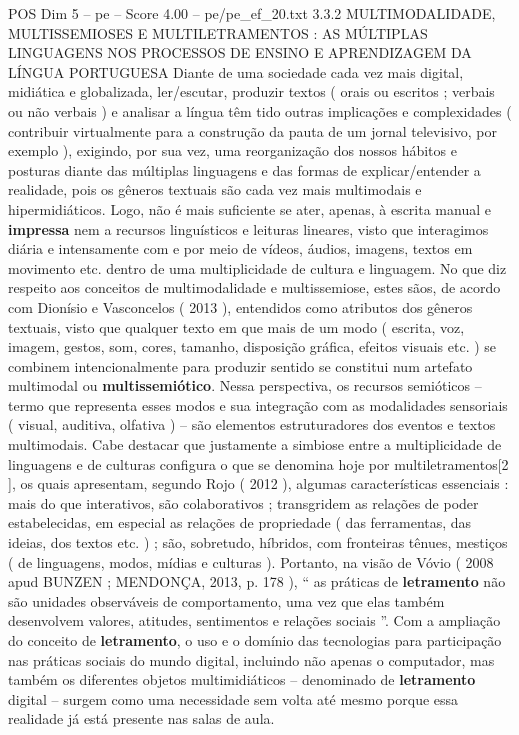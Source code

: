 \begin{textsample}{POS Dim 5 – pe – Score 4.00 – pe/pe\_ef\_20.txt}  \label{ex:f5_pos_210}
3.3.2 MULTIMODALIDADE, MULTISSEMIOSES E MULTILETRAMENTOS : AS MÚLTIPLAS LINGUAGENS NOS PROCESSOS DE ENSINO E APRENDIZAGEM DA LÍNGUA PORTUGUESA Diante de uma sociedade cada vez mais digital, midiática e globalizada, ler/escutar, produzir textos ( orais ou escritos ; verbais ou não verbais ) e analisar a língua têm tido outras implicações e complexidades ( contribuir virtualmente para a construção da pauta de um jornal televisivo, por exemplo ), exigindo, por sua vez, uma reorganização dos nossos hábitos e posturas diante das múltiplas linguagens e das formas de explicar/entender a realidade, pois os gêneros textuais são cada vez mais multimodais e hipermidiáticos.
Logo, não é mais suficiente se ater, apenas, à escrita manual e \textbf{impressa} nem a recursos linguísticos e leituras lineares, visto que interagimos diária e intensamente com e por meio de vídeos, áudios, imagens, textos em movimento etc. dentro de uma multiplicidade de cultura e linguagem.
No que diz respeito aos conceitos de multimodalidade e multissemiose, estes sãos, de acordo com Dionísio e Vasconcelos ( 2013 ), entendidos como atributos dos gêneros textuais, visto que qualquer texto em que mais de um modo ( escrita, voz, imagem, gestos, som, cores, tamanho, disposição gráfica, efeitos visuais etc. ) se combinem intencionalmente para produzir sentido se constitui num artefato multimodal ou \textbf{multissemiótico}.
Nessa perspectiva, os recursos semióticos – termo que representa esses modos e sua integração com as modalidades sensoriais ( visual, auditiva, olfativa ) – são elementos estruturadores dos eventos e textos multimodais.
Cabe destacar que justamente a simbiose entre a multiplicidade de linguagens e de culturas configura o que se denomina hoje por multiletramentos[2 ], os quais apresentam, segundo Rojo ( 2012 ), algumas características essenciais : mais do que interativos, são colaborativos ; transgridem as relações de poder estabelecidas, em especial as relações de propriedade ( das ferramentas, das ideias, dos textos etc. ) ; são, sobretudo, híbridos, com fronteiras tênues, mestiços ( de linguagens, modos, mídias e culturas ).
Portanto, na visão de Vóvio ( 2008 apud BUNZEN ; MENDONÇA, 2013, p. 178 ), “ as práticas de \textbf{letramento} não são unidades observáveis de comportamento, uma vez que elas também desenvolvem valores, atitudes, sentimentos e relações sociais ”.
Com a ampliação do conceito de \textbf{letramento}, o uso e o domínio das tecnologias para participação nas práticas sociais do mundo digital, incluindo não apenas o computador, mas também os diferentes objetos multimidiáticos – denominado de \textbf{letramento} digital – surgem como uma necessidade sem volta até mesmo porque essa realidade já está presente nas salas de aula.

\end{textsample}
